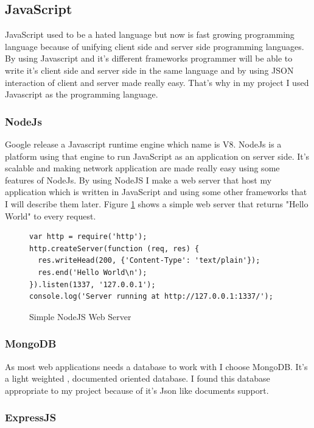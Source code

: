 \documentclass[a4paper,11pt]{report}
\begin{document}
\subsection{JavaScript}

JavaScript used to be a hated language but now is fast growing programming language because of unifying client side and server side programming languages. By using Javascript and it's different frameworks programmer will be able to write it's client side and server side in the same language and by using JSON interaction of client and server made really easy. That's why in my project I used Javascript as the programming language.

\subsubsection{NodeJs}

Google release a Javascript runtime engine which name is V8. NodeJs is a platform using that engine to run JavaScript as an application on server side. It's scalable and making network application are made really easy using some features of NodeJs. By using NodeJS I make a web server that host my application which is written in JavaScript and using some other frameworks that I will describe them later. Figure \ref{fig:nodejsserver} shows a simple web server that returns "Hello World" to every request.

\begin{figure}[!hbp]
\caption{Simple NodeJS Web Server}
\begin{lstlisting}
var http = require('http');
http.createServer(function (req, res) {
  res.writeHead(200, {'Content-Type': 'text/plain'});
  res.end('Hello World\n');
}).listen(1337, '127.0.0.1');
console.log('Server running at http://127.0.0.1:1337/');
\end{lstlisting}
\label{fig:nodejsserver}
\end{figure}

\subsubsection{MongoDB}

As most web applications needs a database to work with I choose MongoDB. It's a light weighted , documented oriented database. I found this database appropriate to my project because of it's Json like documents support.

\subsubsection{ExpressJS}
\end{document}
